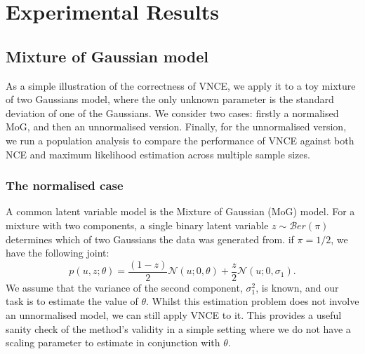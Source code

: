 \documentclass[11pt, oneside]{article}
\newcommand{\pnorm}{p}
\theoremstyle{definition}
\begin{document}
\section{Experimental Results}
\subsection{Mixture of Gaussian model}
\label{sec:mog}
As a simple illustration of the correctness of VNCE, we apply it to a toy mixture of two Gaussians model, where the only unknown parameter is the standard deviation of one of the Gaussians. We consider two cases: firstly a normalised MoG, and then an unnormalised version. Finally, for the unnormalised version, we run a population analysis to compare the performance of VNCE against both NCE and maximum likelihood estimation across multiple sample sizes.


\subsubsection{The normalised case}


\noindent A common latent variable model is the Mixture of Gaussian (MoG) model. For a mixture with two components, a single binary latent variable $z \sim \mathcal{B}er(\pi)$ determines which of two Gaussians the data was generated from. if $\pi = 1/2$, we have the following joint:
\begin{equation}
\pnorm(u, z; \theta) = \frac{(1-z)}{2} \mathcal{N}(u; 0, \theta) + \frac{z}{2} \mathcal{N}(u; 0, \sigma_1).
\label{eq:mog standard}
\end{equation}
We assume that the variance of the second component, $\sigma_1^2$, is known, and our task is to estimate the value of $\theta$. Whilst this estimation problem does not involve an unnormalised model, we can still apply VNCE to it. This provides a useful sanity check of the method's validity in a simple setting where we do not have a scaling parameter to estimate in conjunction with $\theta$.
\end{document}
